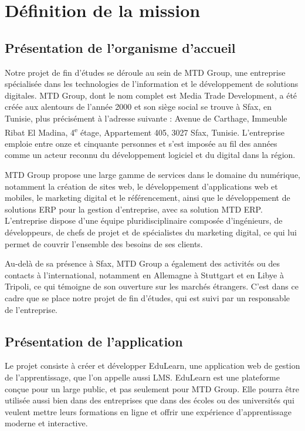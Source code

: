 \documentclass[12pt,a4paper]{report}
\begin{document}
\section{Définition de la mission}
\subsection{Présentation de l'organisme d'accueil}
Notre projet de fin d'études se déroule au sein de MTD Group, une entreprise spécialisée dans les technologies de l'information et le développement de solutions digitales. MTD Group, dont le nom complet est Media Trade Development, a été créée aux alentours de l'année 2000 et son siège social se trouve à Sfax, en Tunisie, plus précisément à l'adresse suivante : Avenue de Carthage, Immeuble Ribat El Madina, 4\textsuperscript{e} étage, Appartement 405, 3027 Sfax, Tunisie. L'entreprise emploie entre onze et cinquante personnes et s'est imposée au fil des années comme un acteur reconnu du développement logiciel et du digital dans la région.

MTD Group propose une large gamme de services dans le domaine du numérique, notamment la création de sites web, le développement d'applications web et mobiles, le marketing digital et le référencement, ainsi que le développement de solutions ERP pour la gestion d'entreprise, avec sa solution MTD ERP. L'entreprise dispose d'une équipe pluridisciplinaire composée d'ingénieurs, de développeurs, de chefs de projet et de spécialistes du marketing digital, ce qui lui permet de couvrir l'ensemble des besoins de ses clients.

Au-delà de sa présence à Sfax, MTD Group a également des activités ou des contacts à l'international, notamment en Allemagne à Stuttgart et en Libye à Tripoli, ce qui témoigne de son ouverture sur les marchés étrangers. C'est dans ce cadre que se place notre projet de fin d'études, qui est suivi par un responsable de l'entreprise.

\subsection{Présentation de l'application}
Le projet consiste à créer et développer EduLearn, une application web de gestion de l'apprentissage, que l'on appelle aussi LMS. EduLearn est une plateforme conçue pour un large public, et pas seulement pour MTD Group. Elle pourra être utilisée aussi bien dans des entreprises que dans des écoles ou des universités qui veulent mettre leurs formations en ligne et offrir une expérience d'apprentissage moderne et interactive.
\end{document}
